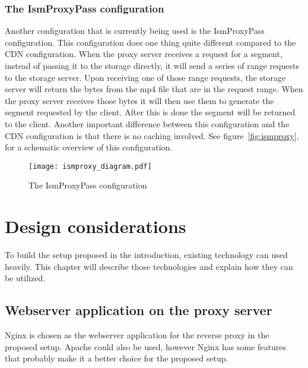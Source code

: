 \documentclass[twoside,openright]{uva-bachelor-thesis}
\begin{document}
\subsection{The IsmProxyPass configuration}
Another configuration that is currently being used is the IsmProxyPass
configuration. This configuration does one thing quite different compared to the
CDN configuration. When the proxy server receives a request for a segment,
instead of passing it to the storage directly, it will send a series of range
requests to the storage server. Upon receiving one of those range requests, the
storage server will return the bytes from the mp4 file that are in the request
range. When the proxy server receives those bytes it will then use them to
generate the segment requested by the client. After this is done the segment
will be returned to the client. Another important difference between this
configuration and the CDN configuration is that there is no caching involved.
See figure~\vref{fig:ismproxy}, for a schematic overview of this configuration.

\begin{figure}

    \texttt{[image: ismproxy\_diagram.pdf]}
    \caption{The IsmProxyPass configuration}\label{fig:ismproxy}

\end{figure}







\chapter{Design considerations}
To build the setup proposed in the introduction, existing technology can used
heavily. This chapter will describe those technologies and explain how they can
be utilized.


\section{Webserver application on the proxy server}
Nginx is chosen as the webserver application for the reverse proxy in the
proposed setup. Apache could also be used, however Nginx has some features that
probably make it a better choice for the proposed setup.
\end{document}

